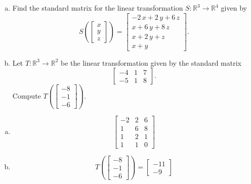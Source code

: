 
\begin{exerciseStatement}

\begin{enumerate}[(a)]
\item Find the standard matrix for the linear transformation \(S:\mathbb{R}^ 3  \to \mathbb{R}^ 4 \) given by \[S\left(  \left[\begin{array}{c}
x \\
y \\
z
\end{array}\right]  \right) =  \left[\begin{array}{c}
-2 \, x + 2 \, y + 6 \, z \\
x + 6 \, y + 8 \, z \\
x + 2 \, y + z \\
x + y
\end{array}\right] .\]
\item Let \(T:\mathbb{R}^ 3  \to \mathbb{R}^ 2 \) be the linear transformation given by the standard matrix \[ \left[\begin{array}{ccc}
-4 & 1 & 7 \\
-5 & 1 & 8
\end{array}\right] .\] Compute \(T\left( \left[\begin{array}{c}
-8 \\
-1 \\
-6
\end{array}\right]  \right)\). 
\end{enumerate}
    
\end{exerciseStatement}
    
\begin{exerciseAnswer} 

\begin{enumerate}[(a)]
\item \[ \left[\begin{array}{ccc}
-2 & 2 & 6 \\
1 & 6 & 8 \\
1 & 2 & 1 \\
1 & 1 & 0
\end{array}\right] \]
\item \[T\left( \left[\begin{array}{c}
-8 \\
-1 \\
-6
\end{array}\right]  \right)= \left[\begin{array}{c}
-11 \\
-9
\end{array}\right] \]
\end{enumerate}
    
\end{exerciseAnswer}
    
